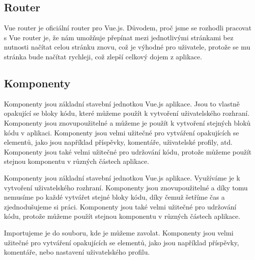 \subsection{Router}

Vue router je oficiální router pro Vue.js. Důvodem, proč jsme se rozhodli
pracovat s Vue router je, že nám umožňuje přepínat mezi jednotlivými stránkami
bez nutnosti načítat celou stránku znovu, což je výhodné pro uživatele, protože
se mu stránka bude načítat rychleji, což zlepší celkový dojem z aplikace.

\subsection{Komponenty}

Komponenty jsou základní stavební jednotkou Vue.js aplikace. Jsou to vlastně
opakující se bloky kódu, které můžeme použít k vytvoření uživatelského rozhraní.
Komponenty jsou znovupoužitelné a můžeme je použít k vytvoření stejných bloků
kódu v aplikaci. Komponenty jsou velmi užitečné pro vytváření opakujících se
elementů, jako jsou například příspěvky, komentáře, uživatelské profily, atd.
Komponenty jsou také velmi užitečné pro udržování kódu, protože můžeme použít
stejnou komponentu v různých částech aplikace.

Komponenty jsou základní stavební jednotkou Vue.js aplikace. Využíváme je
k vytvoření uživatelského rozhraní. Komponenty jsou znovupoužitelné a díky tomu
nemusíme po každé vytvářet stejné bloky kódu, díky čemuž šetříme čas a zjednodušujeme
si práci. Komponenty jsou také velmi užitečné pro udržování kódu, protože můžeme
použít stejnou komponentu v různých částech aplikace.

Importujeme je do souboru, kde
je můžeme zavolat. Komponenty jsou velmi užitečné pro vytváření opakujících se
elementů, jako jsou například příspěvky, komentáře, nebo nastavení uživatelského
profilu. 
